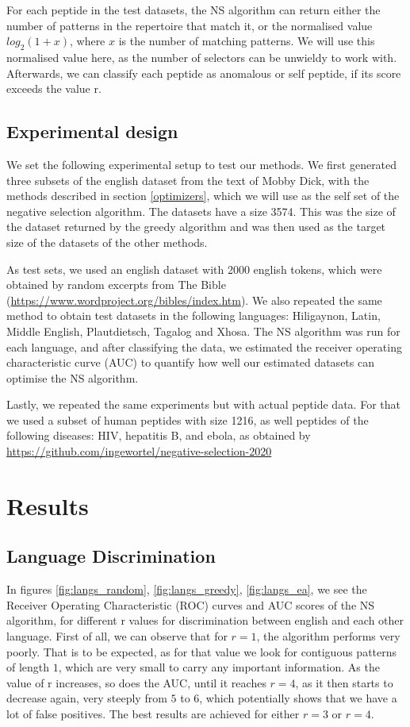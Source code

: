 \documentclass{article}
\begin{document}
For each peptide in the test datasets, the NS algorithm can return either the number of patterns in the repertoire that 
match it, or the normalised value $log_2(1 + x)$, where $x$ is the number of matching patterns. We will use this 
normalised value here, as the number of selectors can be unwieldy to work with. Afterwards, we can classify each peptide 
as anomalous or self peptide, if its score exceeds the value r.

\subsection{Experimental design}
We set the following experimental setup to test our methods. We first generated three subsets of the english dataset 
from the text of Mobby Dick, with the methods described in section \ref{optimizers}, which we will use as the self set of 
the negative selection algorithm. The datasets have a size 3574. This was the size of the dataset returned by the greedy 
algorithm and was then used as the target size of the datasets of the other methods.

As test sets, we used an english dataset with 2000 english tokens, which were obtained by random excerpts from The Bible (\url{https://www.wordproject.org/bibles/index.htm}).
We also repeated the same method to obtain test datasets in the following languages: Hiligaynon, Latin, Middle English, 
Plautdietsch, Tagalog and Xhosa. The NS algorithm was run for each language, and after classifying the data, we 
estimated the receiver operating characteristic curve (AUC) to quantify how well our estimated datasets can optimise 
the NS algorithm.

Lastly, we repeated the same experiments but with actual peptide data. For that we used a subset of human peptides with 
size 1216, as well peptides of the following diseases: HIV, hepatitis B, and ebola, as obtained by \url{https://github.com/ingewortel/negative-selection-2020}



\section{Results}
\subsection{Language Discrimination}
In figures \ref{fig:langs_random}, \ref{fig:langs_greedy}, \ref{fig:langs_ea}, we see the Receiver Operating 
Characteristic (ROC) curves and AUC scores of the NS algorithm, for different r values for discrimination between
english and each other language. First of all, we can observe that for $r=1$, the algorithm performs very poorly. That 
is to be expected, as for that value we look for contiguous patterns of length $1$, which are very small to carry any 
important information. As the value of r increases, so does the AUC, until it reaches $r=4$, as it then starts to 
decrease again, very steeply from $5$ to $6$, which potentially shows that we have a lot of false positives. The best 
results are achieved for either $r=3$ or $r=4$.
\end{document}
